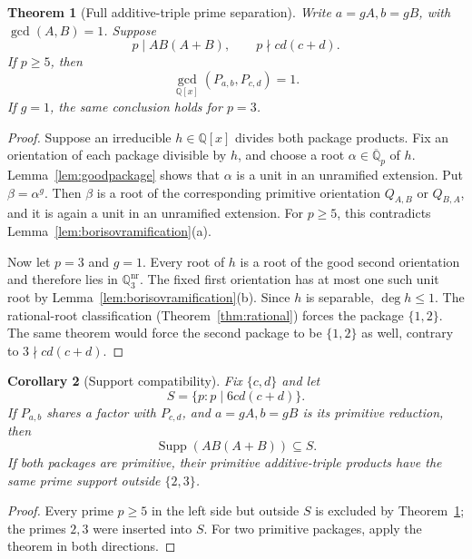 \documentclass[11pt]{article}
\numberwithin{equation}{section}
\newtheorem{theorem}{Theorem}[section]
\newtheorem{corollary}[theorem]{Corollary}
\theoremstyle{definition}
\newcommand{\Q}{\mathbb Q}
\begin{document}
\begin{theorem}[Full additive-triple prime separation]
\label{thm:fullseparation}
Write \(a=gA,b=gB\), with \(\gcd(A,B)=1\).  Suppose
\begin{equation}
 p\mid AB(A+B),\qquad p\nmid cd(c+d).
 \label{eq:11-1}
\end{equation}
If \(p\geq5\), then
\begin{equation}
 \gcd_{\Q[x]}(P_{a,b},P_{c,d})=1.
 \label{eq:11-2}
\end{equation}
If \(g=1\), the same conclusion holds for \(p=3\).
\end{theorem}

\begin{proof}
Suppose an irreducible \(h\in\Q[x]\) divides both package products.  Fix an
orientation of each package divisible by \(h\), and choose a root
\(\alpha\in\overline{\Q}_p\) of \(h\).  Lemma~\ref{lem:goodpackage}
shows that \(\alpha\) is a unit in an unramified extension.  Put
\(\beta=\alpha^g\).  Then \(\beta\) is a root of the corresponding primitive
orientation \(Q_{A,B}\) or \(Q_{B,A}\), and it is again a unit in an
unramified extension.  For \(p\geq5\), this contradicts
Lemma~\ref{lem:borisovramification}(a).

Now let \(p=3\) and \(g=1\).  Every root of \(h\) is a root of the good
second orientation and therefore lies in \(\Q_3^{\mathrm{nr}}\).  The fixed
first orientation has at most one such unit root by
Lemma~\ref{lem:borisovramification}(b).  Since \(h\) is separable,
\(\deg h\leq1\).  The rational-root classification
(Theorem~\ref{thm:rational}) forces the package \(\{1,2\}\).  The same
theorem would force the second package to be \(\{1,2\}\) as well, contrary
to \(3\nmid cd(c+d)\).
\end{proof}

\begin{corollary}[Support compatibility]
\label{cor:supportcompatibility}
Fix \(\{c,d\}\) and let
\[
 S=\{p:p\mid6cd(c+d)\}.
\]
If \(P_{a,b}\) shares a factor with \(P_{c,d}\), and
\(a=gA,b=gB\) is its primitive reduction, then
\begin{equation}
 \operatorname{Supp}(AB(A+B))\subseteq S.
 \label{eq:11-3}
\end{equation}
If both packages are primitive, their primitive additive-triple products have
the same prime support outside \(\{2,3\}\).
\end{corollary}

\begin{proof}
Every prime \(p\geq5\) in the left side but outside \(S\) is excluded by
Theorem~\ref{thm:fullseparation}; the primes \(2,3\) were inserted into
\(S\).  For two primitive packages, apply the theorem in both directions.
\end{proof}
\end{document}
